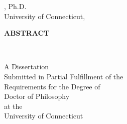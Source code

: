 

\frontmatter
\emptystyles %

\begin{center}
{\LARGE
{\bf\mythesistitle}
}
\vspace{.6in}

\myname, Ph.D.\\
University of Connecticut, \myyear

\vspace{.6in}

{\large\bf ABSTRACT}
\end{center}
\pagestyle{fancy}
\thispagestyle{plain}
\singlespacing


\newpage

\restorestyles %
\begin{center}
{\LARGE
{\bf\mythesistitle}
}
\vspace{.6in}

\myname

\vspace{.6in}

\degreetwo \\
\degreeone

\vfill
A Dissertation \\
Submitted in Partial Fulfillment of the \\
Requirements for the Degree of \\
Doctor of Philosophy \\
at the \\
University of Connecticut

\vspace{.25in}

\myyear

\end{center}
\newpage


